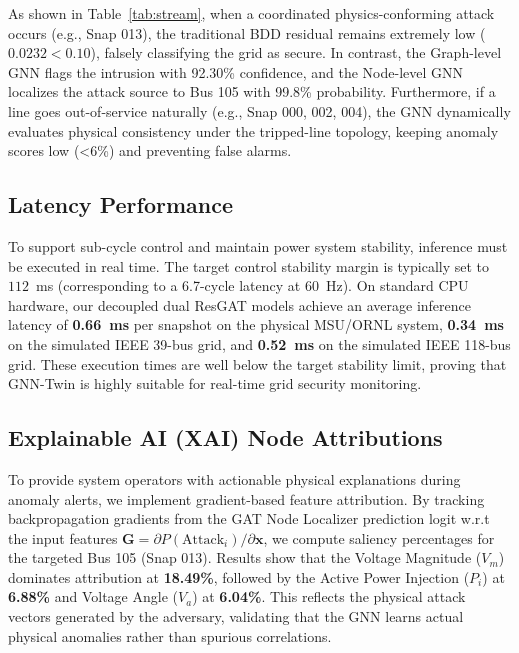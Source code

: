 \documentclass[conference]{IEEEtran}
\begin{document}
As shown in Table~\ref{tab:stream}, when a coordinated physics-conforming attack occurs (e.g., Snap 013), the traditional BDD residual remains extremely low ($0.0232 < 0.10$), falsely classifying the grid as secure. In contrast, the Graph-level GNN flags the intrusion with 92.30\% confidence, and the Node-level GNN localizes the attack source to Bus 105 with 99.8\% probability. Furthermore, if a line goes out-of-service naturally (e.g., Snap 000, 002, 004), the GNN dynamically evaluates physical consistency under the tripped-line topology, keeping anomaly scores low (<6\%) and preventing false alarms.

\subsection{Latency Performance}
To support sub-cycle control and maintain power system stability, inference must be executed in real time. The target control stability margin is typically set to $112$~ms (corresponding to a 6.7-cycle latency at 60~Hz). On standard CPU hardware, our decoupled dual ResGAT models achieve an average inference latency of \textbf{0.66~ms} per snapshot on the physical MSU/ORNL system, \textbf{0.34~ms} on the simulated IEEE 39-bus grid, and \textbf{0.52~ms} on the simulated IEEE 118-bus grid. These execution times are well below the target stability limit, proving that GNN-Twin is highly suitable for real-time grid security monitoring.

\subsection{Explainable AI (XAI) Node Attributions}
To provide system operators with actionable physical explanations during anomaly alerts, we implement gradient-based feature attribution. By tracking backpropagation gradients from the GAT Node Localizer prediction logit w.r.t the input features $\mathbf{G} = \partial P(\text{Attack}_i)/\partial \mathbf{x}$, we compute saliency percentages for the targeted Bus 105 (Snap 013). Results show that the Voltage Magnitude ($V_m$) dominates attribution at \textbf{18.49\%}, followed by the Active Power Injection ($P_i$) at \textbf{6.88\%} and Voltage Angle ($V_a$) at \textbf{6.04\%}. This reflects the physical attack vectors generated by the adversary, validating that the GNN learns actual physical anomalies rather than spurious correlations.
\end{document}

